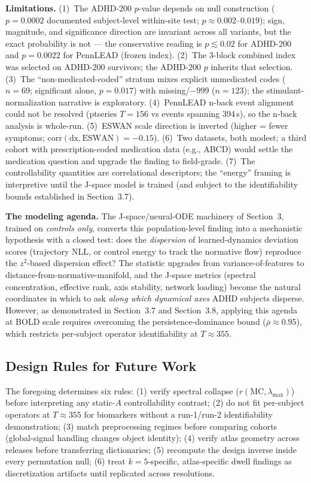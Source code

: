 \documentclass{article}
\begin{document}
\textbf{Limitations.} (1)~The ADHD-200 $p$-value depends on null construction ($p{=}0.0002$ documented subject-level within-site test; $p{\approx}0.002$--$0.019$); sign, magnitude, and significance direction are invariant across all variants, but the exact probability is not --- the conservative reading is $p{\lesssim}0.02$ for ADHD-200 and $p{=}0.0022$ for PennLEAD (frozen index). (2)~The 3-block combined index was selected on ADHD-200 survivors; the ADHD-200 $p$ inherits that selection. (3)~The ``non-medicated-coded'' stratum mixes explicit unmedicated codes ($n{=}69$; significant alone, $p{=}0.017$) with missing/$-999$ ($n{=}123$); the stimulant-normalization narrative is exploratory. (4)~PennLEAD n-back event alignment could not be resolved (ptseries $T{=}156$ vs events spanning 394\,s), so the n-back analysis is whole-run. (5)~ESWAN scale direction is inverted (higher = fewer symptoms; $\mathrm{corr}(\mathrm{dx},\mathrm{ESWAN}){=}-0.15$). (6)~Two datasets, both modest; a third cohort with prescription-coded medication data (e.g., ABCD) would settle the medication question and upgrade the finding to field-grade. (7)~The controllability quantities are correlational descriptors; the ``energy'' framing is interpretive until the J-space model is trained (and subject to the identifiability bounds established in Section~3.7).

\textbf{The modeling agenda.} The J-space/neural-ODE machinery of Section~3, trained on \emph{controls only}, converts this population-level finding into a mechanistic hypothesis with a closed test: does the \emph{dispersion} of learned-dynamics deviation scores (trajectory NLL, or control energy to track the normative flow) reproduce the $z^2$-based dispersion effect? The statistic upgrades from variance-of-features to distance-from-normative-manifold, and the J-space metrics (spectral concentration, effective rank, axis stability, network loading) become the natural coordinates in which to ask \emph{along which dynamical axes} ADHD subjects disperse. However, as demonstrated in Section~3.7 and Section~3.8, applying this agenda at BOLD scale requires overcoming the persistence-dominance bound ($\bar{\rho} \approx 0.95$), which restricts per-subject operator identifiability at $T \approx 355$.

\subsection{Design Rules for Future Work}

The foregoing determines six rules: (1) verify spectral collapse ($r(\mathrm{MC},\lambda_{\max})$) before interpreting any static-$A$ controllability contrast; (2) do not fit per-subject operators at $T{\approx}355$ for biomarkers without a run-1/run-2 identifiability demonstration; (3) match preprocessing regimes before comparing cohorts (global-signal handling changes object identity); (4) verify atlas geometry across releases before transferring dictionaries; (5) recompute the design inverse inside every permutation null; (6) treat $k{=}5$-specific, atlas-specific dwell findings as discretization artifacts until replicated across resolutions.
\end{document}
